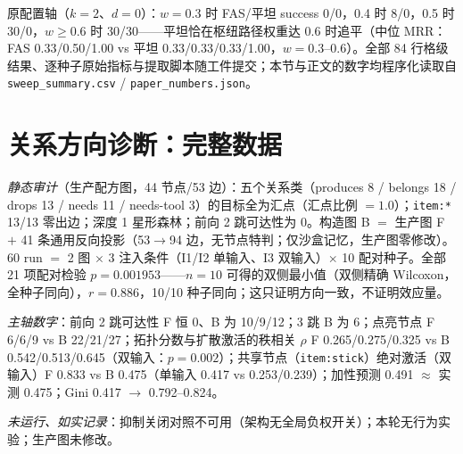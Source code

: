\documentclass[10pt,a4paper]{ctexart}
\begin{document}
原配置轴（$k{=}2$、$d{=}0$）：$w{=}0.3$ 时 FAS/平坦 success 0/0，0.4 时 8/0，0.5 时 30/0，$w\ge0.6$ 时 30/30——平坦恰在枢纽路径权重达 0.6 时追平（中位 MRR：FAS 0.33/0.50/1.00 vs 平坦 0.33/0.33/0.33/1.00，$w{=}0.3$--0.6）。全部 84 行格级结果、逐种子原始指标与提取脚本随工件提交；本节与正文的数字均程序化读取自 \texttt{sweep\_summary.csv} / \texttt{paper\_numbers.json}。

\section{关系方向诊断：完整数据}
\label{s9:reldir}

\emph{静态审计}（生产配方图，44 节点/53 边）：五个关系类（produces 8 / belongs 18 / drops 13 / needs 11 / needs-tool 3）的目标全为汇点（汇点比例 $=1.0$）；\texttt{item:*} 13/13 零出边；深度 1 星形森林；前向 2 跳可达性为 0。构造图 B $=$ 生产图 F $+$ 41 条通用反向投影（53$\rightarrow$94 边，无节点特判；仅沙盒记忆，生产图零修改）。60 run $=$ 2 图 $\times$ 3 注入条件（I1/I2 单输入、I3 双输入）$\times$ 10 配对种子。全部 21 项配对检验 $p{=}0.001953$——$n{=}10$ 可得的双侧最小值（双侧精确 Wilcoxon，全种子同向），$r{=}0.886$，10/10 种子同向；这只证明方向一致，不证明效应量。

\emph{主轴数字}：前向 2 跳可达性 F 恒 0、B 为 10/9/12；3 跳 B 为 6；点亮节点 F 6/6/9 vs B 22/21/27；拓扑分数与扩散激活的秩相关 $\rho$ F 0.265/0.275/0.325 vs B 0.542/0.513/0.645（双输入：$p{=}0.002$）；共享节点（\texttt{item:stick}）绝对激活（双输入）F 0.833 vs B 0.475（单输入 0.417 vs 0.253/0.239）；加性预测 0.491 $\approx$ 实测 0.475；Gini 0.417 $\rightarrow$ 0.792--0.824。

\emph{未运行、如实记录}：抑制关闭对照不可用（架构无全局负权开关）；本轮无行为实验；生产图未修改。
\end{document}
